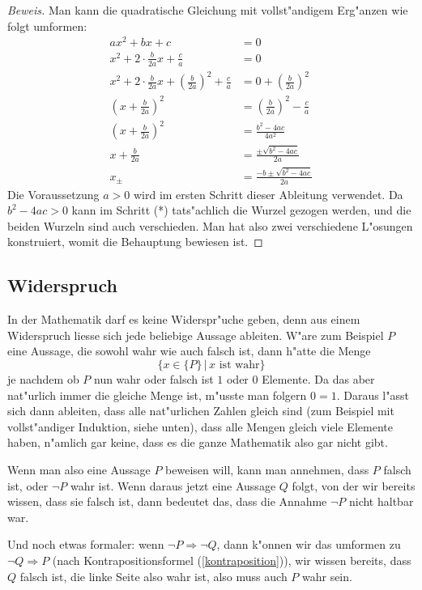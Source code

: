 \begin{proof}[Beweis]
Man kann die quadratische Gleichung mit vollst"andigem Erg"anzen wie
folgt umformen:
\begin{align*}
ax^2+bx+c&=0\\
x^2+2\cdot \frac{b}{2a} x +\frac{c}a&=0\\
x^2+2\cdot \frac{b}{2a} x 
+\left(\frac{b}{2a}\right)^2
+\frac{c}a&=0
+\left(\frac{b}{2a}\right)^2\\
\left(x+\frac{b}{2a}\right)^2 &= \left(\frac{b}{2a}\right)^2 -\frac{c}a \\
\left(x+\frac{b}{2a}\right)^2 &=
\frac{b^2-4ac}{4a^2}\\
x+\frac{b}{2a}&=\frac{\pm\sqrt{b^2-4ac}}{2a}\tag{*}\\
x_{\pm}&=\frac{-b\pm\sqrt{b^2-4ac}}{2a}
\end{align*}
Die Voraussetzung $a>0$ wird im ersten Schritt dieser Ableitung verwendet.
Da $b^2-4ac>0$ kann im Schritt (*) tats"achlich die Wurzel gezogen werden,
und die beiden Wurzeln sind auch verschieden. Man hat also zwei verschiedene
L"osungen konstruiert, womit die Behauptung bewiesen ist.
\end{proof}

\subsection{Widerspruch\label{widerspruchsbeweis}}
In der Mathematik darf es keine Widerspr"uche geben, denn aus einem
Widerspruch liesse sich jede beliebige Aussage ableiten. W"are zum
Beispiel $P$ eine Aussage, die sowohl wahr wie auch falsch ist,
dann h"atte die Menge
\[
\{x\in\{P\}\,|\, \text{$x$ ist wahr}\}
\]
je nachdem ob $P$ nun wahr oder falsch ist $1$ oder $0$ Elemente.
Da das aber nat"urlich immer die gleiche Menge ist, m"usste man
folgern $0=1$. Daraus l"asst sich dann ableiten, dass alle nat"urlichen
Zahlen gleich sind (zum Beispiel mit vollst"andiger Induktion, siehe
unten), dass alle Mengen gleich viele Elemente haben, n"amlich gar
keine, dass es die ganze Mathematik also gar nicht gibt.

Wenn man also eine Aussage $P$ beweisen will, kann man annehmen,
dass $P$ falsch ist, oder $\neg P$ wahr ist. Wenn daraus jetzt
eine Aussage $Q$ folgt, von der wir bereits wissen, dass sie falsch
ist, dann bedeutet das, dass die Annahme $\neg P$ nicht haltbar
war.

Und noch etwas formaler: wenn $\neg P\Rightarrow \neg Q$, dann k"onnen
wir das umformen zu $\neg Q\Rightarrow P$ (nach Kontrapositionsformel
(\ref{kontraposition})), wir wissen bereits, dass
$Q$ falsch ist, die linke Seite also wahr ist, also muss auch $P$
wahr sein.

